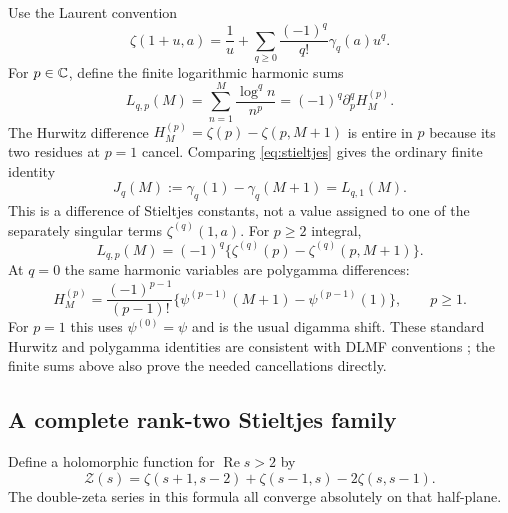 \documentclass[11pt,letterpaper]{article}
\numberwithin{equation}{section}
\theoremstyle{definition}\newtheorem{definition}[theorem]{Definition}
\theoremstyle{remark}\newtheorem{remark}[theorem]{Remark}
\begin{document}
Use the Laurent convention
\begin{equation}\label{eq:stieltjes}
 \zeta(1+u,a)=\frac1u+
          \sum_{q\ge0}\frac{(-1)^q}{q!}\gamma_q(a)u^q.
\end{equation}
For $p\in\mathbb C$, define the finite logarithmic harmonic sums
\begin{equation}\label{eq:Lpq}
 L_{q,p}(M)=\sum_{n=1}^M\frac{\log^q n}{n^p}
                  =(-1)^q\partial_p^qH_M^{(p)}.
\end{equation}
The Hurwitz difference $H_M^{(p)}=\zeta(p)-\zeta(p,M+1)$ is entire
in $p$ because its two residues at $p=1$ cancel. Comparing
\eqref{eq:stieltjes} gives the ordinary finite identity
\begin{equation}\label{eq:Jq}
          J_q(M):=\gamma_q(1)-\gamma_q(M+1)=L_{q,1}(M).
\end{equation}
This is a difference of Stieltjes constants, not a value assigned to
one of the separately singular terms $\zeta^{(q)}(1,a)$.
For $p\ge2$ integral,
\begin{equation}\label{eq:Lzeta}
 L_{q,p}(M)=(-1)^q
                  \{\zeta^{(q)}(p)-\zeta^{(q)}(p,M+1)\}.
\end{equation}
At $q=0$ the same harmonic variables are polygamma differences:
\begin{equation}\label{eq:polyGamma}
 H_M^{(p)}=\frac{(-1)^{p-1}}{(p-1)!}
       \{\psi^{(p-1)}(M+1)-\psi^{(p-1)}(1)\},
                   \qquad p\ge1.
\end{equation}
For $p=1$ this uses $\psi^{(0)}=\psi$ and is the usual digamma shift.
These standard Hurwitz and polygamma identities are consistent with
DLMF conventions \cite{dlmf-zeta}; the finite sums above also prove
the needed cancellations directly.

\subsection{A complete rank-two Stieltjes family}

Define a holomorphic function for $\operatorname{Re}s>2$ by
\begin{equation}\label{eq:Zmaster}
 \mathcal Z(s)=\zeta(s+1,s-2)+\zeta(s-1,s)-2\zeta(s,s-1).
\end{equation}
The double-zeta series in this formula all converge absolutely on
that half-plane.
\end{document}

